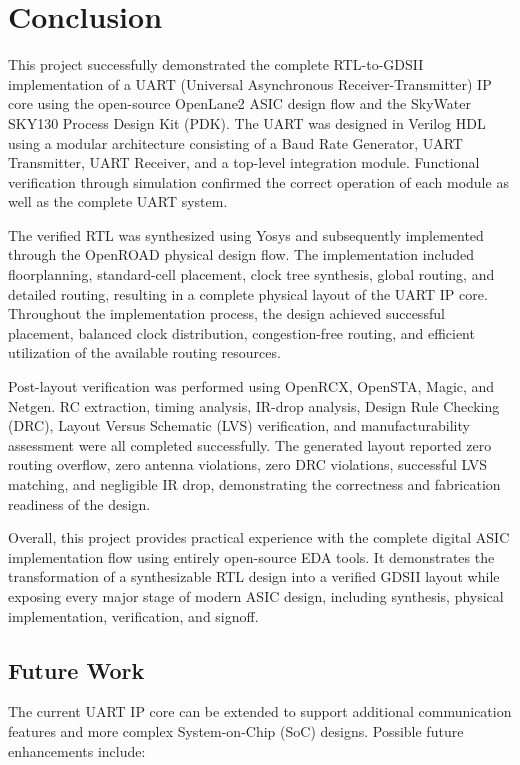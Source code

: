 \chapter{Conclusion}
\label{chap:conclusion}

This project successfully demonstrated the complete RTL-to-GDSII implementation of a UART (Universal Asynchronous Receiver-Transmitter) IP core using the open-source OpenLane2 ASIC design flow and the SkyWater SKY130 Process Design Kit (PDK). The UART was designed in Verilog HDL using a modular architecture consisting of a Baud Rate Generator, UART Transmitter, UART Receiver, and a top-level integration module. Functional verification through simulation confirmed the correct operation of each module as well as the complete UART system.

The verified RTL was synthesized using Yosys and subsequently implemented through the OpenROAD physical design flow. The implementation included floorplanning, standard-cell placement, clock tree synthesis, global routing, and detailed routing, resulting in a complete physical layout of the UART IP core. Throughout the implementation process, the design achieved successful placement, balanced clock distribution, congestion-free routing, and efficient utilization of the available routing resources.

Post-layout verification was performed using OpenRCX, OpenSTA, Magic, and Netgen. RC extraction, timing analysis, IR-drop analysis, Design Rule Checking (DRC), Layout Versus Schematic (LVS) verification, and manufacturability assessment were all completed successfully. The generated layout reported zero routing overflow, zero antenna violations, zero DRC violations, successful LVS matching, and negligible IR drop, demonstrating the correctness and fabrication readiness of the design.

Overall, this project provides practical experience with the complete digital ASIC implementation flow using entirely open-source EDA tools. It demonstrates the transformation of a synthesizable RTL design into a verified GDSII layout while exposing every major stage of modern ASIC design, including synthesis, physical implementation, verification, and signoff.

\section*{Future Work}

The current UART IP core can be extended to support additional communication features and more complex System-on-Chip (SoC) designs. Possible future enhancements include:

